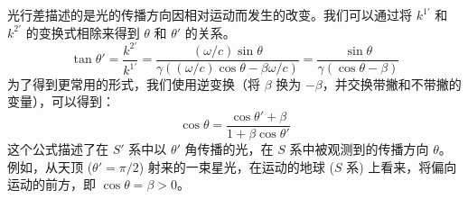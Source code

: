 \documentclass[fontset=none]{ctexart}
\begin{document}
\begin{proposition}[光行差]
光行差描述的是光的传播方向因相对运动而发生的改变。我们可以通过将 $k^{1'}$ 和 $k^{2'}$ 的变换式相除来得到 $\theta$ 和 $\theta'$ 的关系。
\begin{equation}
\tan\theta' = \frac{k^{2'}}{k^{1'}} = \frac{(\omega/c)\sin\theta}{\gamma((\omega/c)\cos\theta - \beta\omega/c)} = \frac{\sin\theta}{\gamma(\cos\theta - \beta)}
\end{equation}
为了得到更常用的形式，我们使用逆变换（将 $\beta$ 换为 $-\beta$，并交换带撇和不带撇的变量），可以得到：
\begin{equation}
\cos\theta = \frac{\cos\theta' + \beta}{1 + \beta\cos\theta'}
\end{equation}
这个公式描述了在 $S'$ 系中以 $\theta'$ 角传播的光，在 $S$ 系中被观测到的传播方向 $\theta$。例如，从天顶 ($\theta'=\pi/2$) 射来的一束星光，在运动的地球 ($S$ 系) 上看来，将偏向运动的前方，即 $\cos\theta = \beta > 0$。
\end{proposition}
\end{document}
